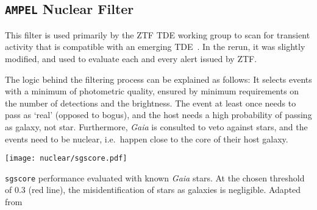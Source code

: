 \subsection{\texttt{AMPEL} Nuclear Filter}\label{nuclear_filter}

This filter is used primarily by the ZTF TDE working group to scan for transient activity that is compatible with an emerging TDE~\cite{Velzen2021a}. In the rerun, it was slightly modified, and used to evaluate each and every alert issued by ZTF.

The logic behind the filtering process can be explained as follows: It selects events with a minimum of photometric quality, ensured by minimum requirements on the number of detections and the brightness. The event at least once needs to pass as `real' (opposed to bogus), and the host needs a high probability of passing as galaxy, not star. Furthermore, \textit{Gaia} is consulted to veto against stars, and the events need to be nuclear, i.e.~happen close to the core of their host galaxy.

\begin{marginfigure}
  \texttt{[image: nuclear/sgscore.pdf]}
  \caption[\texttt{sgscore} performance]{\texttt{sgscore} performance evaluated with known \textit{Gaia} stars. At the chosen threshold of 0.3 (red line), the misidentification of stars as galaxies is negligible. Adapted from~\cite{Tachibana2018}}
\end{marginfigure}

